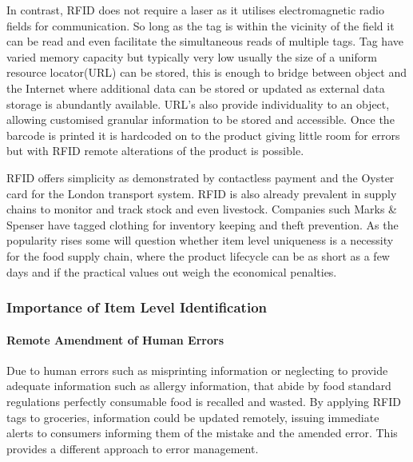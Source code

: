 \documentclass[a4paper, 11pt]{article}
\begin{document}
In contrast, RFID does not require a laser as it utilises electromagnetic radio fields for communication. So long as the tag is within the vicinity of the field it can be read and even facilitate the simultaneous reads of multiple tags. Tag have varied memory capacity but typically very low usually the size of a uniform resource locator(URL) can be stored, this is enough to bridge between object and the Internet where additional data can be stored or updated as external data storage is abundantly available. URL's also provide individuality to an object, allowing customised granular information to be stored and accessible. Once the barcode is printed it is hardcoded on to the product giving little room for errors but with RFID remote alterations of the product is possible.\cite{georgeR}

RFID offers simplicity as demonstrated by contactless payment and the Oyster card for the London transport system. RFID is also already prevalent in supply chains to monitor and track stock and even livestock. Companies such Marks \& Spenser have tagged clothing for inventory keeping and theft prevention.\cite{retailRFID} As the popularity rises some will question whether item level uniqueness is a necessity for the food supply chain, where the product lifecycle can be as short as a few days and if the practical values out weigh the economical penalties. 

\vspace{\baselineskip}
\vspace{\baselineskip}
\vspace{\baselineskip}

\subsubsection{Importance of Item Level Identification}

\paragraph{Remote Amendment of Human Errors}
Due to human errors such as misprinting information or neglecting to provide adequate information such as allergy information, that abide by food standard regulations perfectly consumable food is recalled and wasted.\cite{FDA} By applying RFID tags to groceries, information could be updated remotely, issuing immediate alerts to consumers informing them of the mistake and the amended error. This provides a different approach to error management.
\end{document}
